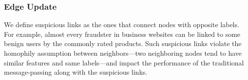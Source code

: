 




\subsubsection{Edge Update} 
\label{subsec:edge}
We define suspicious links as the ones that connect nodes with opposite labels. For example, almost every fraudster in business websites can be linked to some benign users by the commonly rated products. Such suspicious links violate the homophily assumption between neighbors—two neighboring nodes tend to have similar features and same labels—and impact the performance of the traditional message-passing along with the suspicious links.

